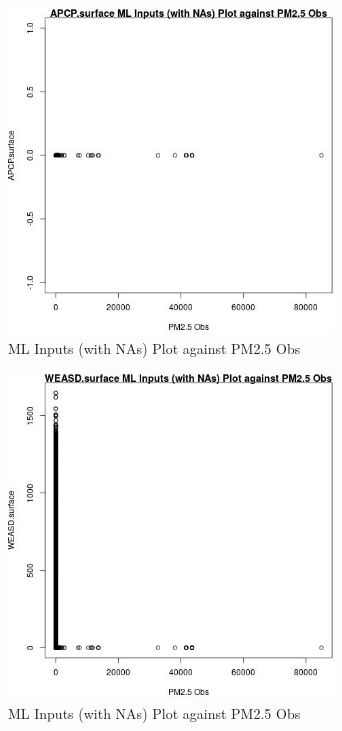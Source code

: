 \begin{figure} 
\centering  
\includegraphics[width=0.77\textwidth]{Code_Outputs/Report_ML_input_PM25_Step4_part_f_de_duplicated_aves_prioritize_24hr_obswNAs_APCPsurfacevPM25_Obs.jpg} 
\caption{\label{fig:Report_ML_input_PM25_Step4_part_f_de_duplicated_aves_prioritize_24hr_obswNAsAPCPsurfacevPM25_Obs}ML Inputs (with NAs) Plot against PM2.5 Obs} 
\end{figure} 
 

\clearpage 

\begin{figure} 
\centering  
\includegraphics[width=0.77\textwidth]{Code_Outputs/Report_ML_input_PM25_Step4_part_f_de_duplicated_aves_prioritize_24hr_obswNAs_WEASDsurfacevPM25_Obs.jpg} 
\caption{\label{fig:Report_ML_input_PM25_Step4_part_f_de_duplicated_aves_prioritize_24hr_obswNAsWEASDsurfacevPM25_Obs}ML Inputs (with NAs) Plot against PM2.5 Obs} 
\end{figure} 
 

